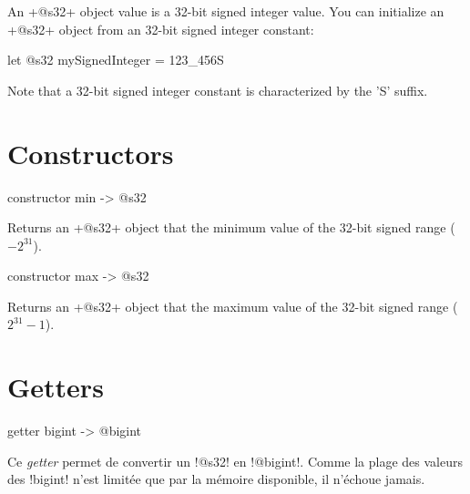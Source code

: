 



An \ggsq+@s32+ object value is a 32-bit signed integer value. You can initialize an \ggsq+@s32+ object from an 32-bit signed integer constant:\\

\begin{galgas4}
let @s32 mySignedInteger = 123_456S
\end{galgas4}


Note that a 32-bit signed integer constant is characterized by the 'S' suffix.


\section{Constructors}


\begin{galgas4}
constructor min -> @s32
\end{galgas4}

Returns an \ggsq+@s32+ object that the minimum value of the 32-bit signed range ($-2^{31}$).






\begin{galgas4}
constructor max -> @s32
\end{galgas4}


Returns an \ggsq+@s32+ object that the maximum value of the 32-bit signed range ($2^{31}-1$).



\section{Getters}


\begin{galgas4box}
getter bigint -> @bigint
\end{galgas4box}

Ce \emph{getter} permet de convertir un \ggsq!@s32! en \ggsq!@bigint!. Comme la plage des valeurs des \ggsq!bigint! n'est limitée que par la mémoire disponible, il n'échoue jamais.

